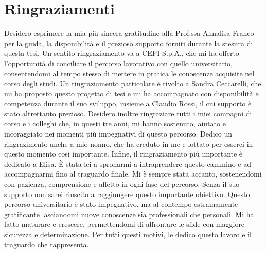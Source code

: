\documentclass[12pt,a4paper,openright,twoside]{book}
\renewenvironment{acknowledgements}
  {\chapter*{Ringraziamenti}}
  {}
\begin{document}
\begin{acknowledgements}
    Desidero esprimere la mia più sincera gratitudine alla Prof.ssa Annalisa Franco per la guida,
    la disponibilità e il prezioso supporto forniti durante la stesura di questa tesi.
    Un sentito ringraziamento va a CEPI S.p.A., che mi ha offerto l'opportunità di conciliare
    il percorso lavorativo con quello universitario, consentendomi al tempo stesso di mettere in pratica
    le conoscenze acquisite nel corso degli studi.
    Un ringraziamento particolare è rivolto a Sandra Ceccarelli, che mi ha proposto questo progetto di tesi
    e mi ha accompagnato con disponibilità e competenza durante il suo sviluppo, insieme a Claudio Rossi,
    il cui supporto è stato altrettanto prezioso.
    Desidero inoltre ringraziare tutti i miei compagni di corso e i colleghi che, in questi tre anni, mi hanno sostenuto,
    aiutato e incoraggiato nei momenti più impegnativi di questo percorso.
    Dedico un ringrazimento anche a mio nonno, che ha creduto in me e lottato per esserci in questo momento così importante.
    Infine, il ringraziamento più importante è dedicato a Elisa. È stata lei a spronarmi a intraprendere questo cammino
    e ad accompagnarmi fino al traguardo finale. Mi è sempre stata accanto, sostenendomi con pazienza,
    comprensione e affetto in ogni fase del percorso. Senza il suo supporto non sarei riuscito a raggiungere
    questo importante obiettivo.
    Questo percorso universitario è stato impegnativo, ma al contempo estramamente gratificante
    lasciandomi nuove conoscenze sia professionali che personali. Mi ha fatto
    maturare e crescere, permettendomi di affrontare le sfide con maggiore sicurezza e determinazione.
    Per tutti questi motivi, le dedico questo lavoro e il traguardo che rappresenta.
\end{acknowledgements}
\end{document}
